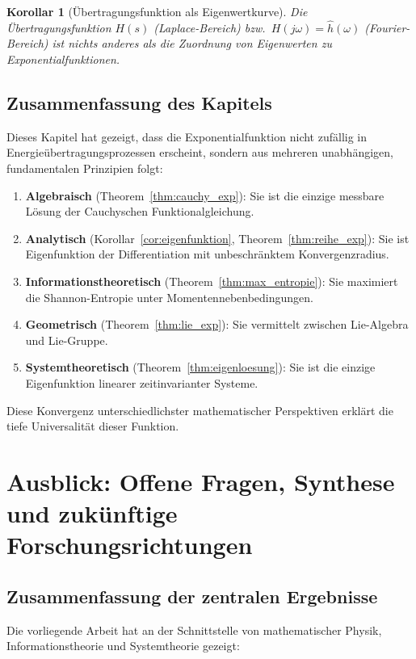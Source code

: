 ﻿\documentclass[12pt,a4paper]{article}
\newtheorem{corollary}[theorem]{Korollar}
\theoremstyle{definition}
\theoremstyle{remark}
\begin{document}
\begin{corollary}[Übertragungsfunktion als Eigenwertkurve]
Die Übertragungsfunktion $H(s)$ (Laplace-Bereich) bzw.\ $H(j\omega) = \hat{h}(\omega)$ (Fourier-Bereich) ist nichts anderes als die Zuordnung von Eigenwerten zu Exponentialfunktionen.
\end{corollary}

\subsection{Zusammenfassung des Kapitels}

Dieses Kapitel hat gezeigt, dass die Exponentialfunktion nicht zufällig in Energieübertra\-gungsprozessen erscheint, sondern aus mehreren unabhängigen, fundamentalen Prinzipien folgt:
\begin{enumerate}
\item \textbf{Algebraisch} (Theorem~\ref{thm:cauchy_exp}): Sie ist die einzige messbare Lösung der Cauchyschen Funktionalgleichung.
\item \textbf{Analytisch} (Korollar~\ref{cor:eigenfunktion}, Theorem~\ref{thm:reihe_exp}): Sie ist Eigenfunktion der Differentiation mit unbeschränktem Konvergenzradius.
\item \textbf{Informationstheoretisch} (Theorem~\ref{thm:max_entropie}): Sie maximiert die Shannon-Entropie unter Momentennebenbedingungen.
\item \textbf{Geometrisch} (Theorem~\ref{thm:lie_exp}): Sie vermittelt zwischen Lie-Algebra und Lie-Gruppe.
\item \textbf{Systemtheoretisch} (Theorem~\ref{thm:eigenloesung}): Sie ist die einzige Eigenfunktion linearer zeitinvarianter Systeme.
\end{enumerate}
Diese Konvergenz unterschiedlichster mathematischer Perspektiven erklärt die tiefe Universalität dieser Funktion.

\section{Ausblick: Offene Fragen, Synthese und zukünftige Forschungsrichtungen}
\label{sec:ausblick}

\subsection{Zusammenfassung der zentralen Ergebnisse}

Die vorliegende Arbeit hat an der Schnittstelle von mathematischer Physik, Informationstheorie und Systemtheorie gezeigt:
\end{document}
